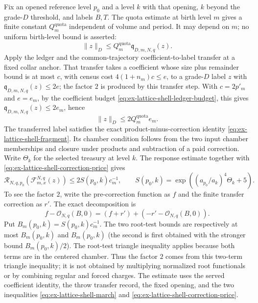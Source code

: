 Fix an opened reference level $p_0$ and a level $k$ with that opening,
$k$ beyond the grade-$D$ threshold, and labels $B,T$. The quota estimate
at birth level $m$ gives a finite constant $Q_m^{\mathrm{quota}}$
independent of volume and period. It may depend on $m$; no uniform
birth-level bound is asserted:
\begin{equation}\label{eq:ex-lattice-shell-quota}
 \|z\|_D\le Q_m^{\mathrm{quota}}\mathfrak q_{D,m,N,q}(z).
\end{equation}
Apply the ledger and the common-trajectory coefficient-to-label transfer at a
fixed collar anchor. That transfer takes a coefficient whose size plus
remainder bound is at most $c$, with census cost $4(1+n_m)c\le e$, to a
grade-$D$ label $z$ with $\mathfrak q_{D,m,N,q}(z)\le2e$; the factor $2$
is produced by this transfer step.  With $c=2p'_m$ and $e=e_m$, by the
coefficient budget \eqref{eq:ex-lattice-shell-ledger-budget}, this gives
$\mathfrak q_{D,m,N,q}(z)\le2e_m$, hence
\[
 \|z\|_D\le2Q_m^{\mathrm{quota}}e_m.
\]
The transferred label satisfies the exact product-minus-correction
identity \eqref{eq:ex-lattice-shell-fragment}. Its chamber condition follows
from the two input chamber memberships and closure under products and
subtraction of a paid correction. Write $\Theta_k$ for the selected
treasury at level $k$. The response estimate together with
\eqref{eq:ex-lattice-shell-correction-price} gives
\begin{equation}\label{eq:ex-lattice-shell-root}
 \mathcal R_{N,q,p_0}(\mathcal F_{m,x}^{N,q}(z))
       \le 2S(p_0,k)c_m^{-1},
 \qquad
 S(p_0,k)=\exp\!\left((a_{p_0}/a_k)^4\Theta_k+5\right).
\end{equation}
To see the factor $2$, write the pre-correction function as $f$ and the
finite transfer correction as $r'$. The exact decomposition is
\[
 f-\mathcal O_{N,q}(B,0)
   =(f+r')+(-r'-\mathcal O_{N,q}(B,0)).
\]
Put $B_m(p_0,k)=S(p_0,k)c_m^{-1}$. The two root-test bounds are respectively
at most $B_m(p_0,k)$ and $B_m(p_0,k)$ (the second is first obtained with the
stronger bound $B_m(p_0,k)/2$). The root-test triangle inequality applies because both
terms are in the centered chamber. Thus the factor $2$ comes from this
two-term triangle inequality; it is not obtained by multiplying normalized
root functionals or by combining regular and forced charges. The estimate uses
the served coefficient identity, the throw transfer record, the fixed opening, and
the two inequalities \eqref{eq:ex-lattice-shell-march} and
\eqref{eq:ex-lattice-shell-correction-price}.


